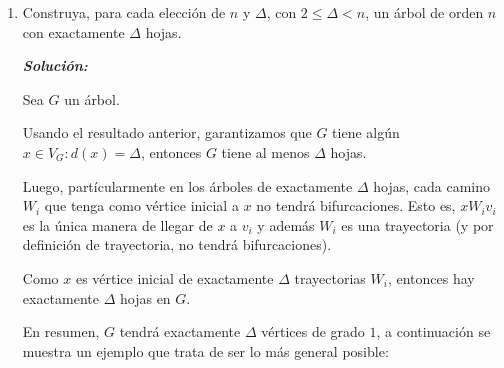 \documentclass{article}
\begin{document}
\begin{enumerate}
\begin{enumerate}
\begin{proof}
          Luego, como $x$ tiene $\Delta$ vecinos, entonces podemos tomar al menos
          $\Delta$ trayectorias distintas entre ellas tales que terminen en alg\'un
          v\'ertice $u_i$ ($1 \leq i \leq \Delta$).

          Así, cada $u_i$ es una hoja de $G$ y como hemos encontrado $\Delta$ hojas
          podemos concluir que el \'arbol $G$ con grado m\'aximo $\Delta$ tiene al menos
          $\Delta$ hojas. \\
          \\
        \end{proof}
  \newpage
      \item Construya, para cada elecci\'on de $n$ y $\Delta$,
        con $2\le \Delta < n$, un \'arbol de orden $n$ con
        exactamente $\Delta$ hojas.

          \textbf{\textit{Soluci\'on:}}

          Sea $G$ un \'arbol.

          Usando el resultado anterior, garantizamos que $G$ tiene alg\'un
          $x \in V_G : d(x) = \Delta$, entonces $G$ tiene al menos $\Delta$ hojas.

          Luego, part\'icularmente en los \'arboles de
          exactamente $\Delta$ hojas, cada camino $W_i$ que tenga como v\'ertice
          inicial a $x$ no tendr\'a bifurcaciones. Esto es, $x W_i v_i$ es la
          \'unica manera de llegar de $x$ a $v_i$ y adem\'as $W_i$ es una trayectoria
          (y por definici\'on de trayectoria, no tendr\'a bifurcaciones).

          Como $x$ es v\'ertice inicial de exactamente $\Delta$ trayectorias $W_i$,
          entonces hay exactamente $\Delta$ hojas en $G$.

          En resumen, $G$ tendr\'a exactamente $\Delta$ v\'ertices de grado $1$,
          a continuaci\'on se muestra un ejemplo que trata de ser lo m\'as general
          posible:

        \begin{figure}[ht!]
          \centering
\end{figure}
\end{enumerate}
\end{enumerate}
\end{document}
